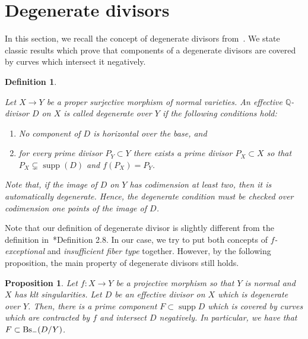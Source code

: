 \documentclass{amsart}
\newcommand{\supp}{\operatorname{supp}}
\renewcommand{\qq}{\mathbb{Q}}
\newtheorem{proposition}[theorem]{Proposition}
\newtheorem{definition}[theorem]{Definition}
\theoremstyle{remark}
\numberwithin{equation}{section}
\begin{document}
\section{Degenerate divisors}\label{sec:deg}
In this section, we recall the concept of degenerate divisors from~\cite{Lai11}.
We state classic results which prove that components of a degenerate divisors are covered by curves which intersect it negatively.

\begin{definition}\label{def:degenerate}
{\em 
Let $X\rightarrow Y$ be a proper surjective morphism of normal varieties.
An effective $\qq$-divisor $D$ on $X$ is called {\em degenerate over $Y$} if the following conditions hold:
\begin{enumerate}
    \item No component of $D$ is horizontal over the base, and 
    \item for every prime divisor $P_Y\subset Y$ there exists a prime divisor $P_X\subset X$ so that $P_X\subsetneq \supp(D)$ and
$f(P_X)=P_Y$.
\end{enumerate}
Note that, if the image of $D$ on $Y$ has codimension at least two, 
then it is automatically degenerate.
Hence, the degenerate condition must be checked over codimension one points of the image of $D$.
}
\end{definition}

Note that our definition of degenerate divisor is slightly different from the definition in~\cite{Lai11}*{Definition 2.8}. In our case, we try to put both concepts of {\em $f$-exceptional} and {\em insufficient fiber type} together.
However, by the following proposition, the main property of degenerate divisors still holds.

\begin{proposition}\label{prop:divisor-trivial-over-basis}
Let $f\colon X\rightarrow Y$ be a projective morphism so that $Y$ is normal and $X$ has klt singularities.
Let $D$ be an effective divisor on $X$ which is degenerate over $Y$.
Then, there is a prime component $F\subset \supp D$ which is covered by curves which are contracted by $f$ and intersect $D$ negatively.
In particular, we have that 
$F\subset {\rm Bs}_{-}(D/Y)$.
\end{proposition}
\end{document}
